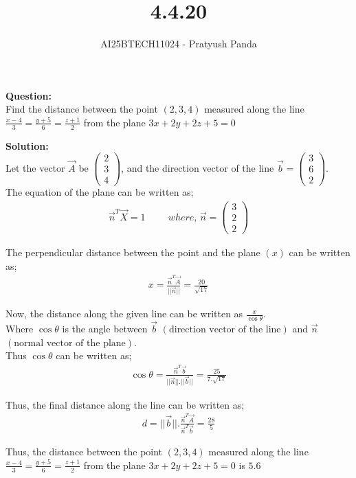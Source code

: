\documentclass{beamer}
\title{4.4.20}
\author{AI25BTECH11024 - Pratyush Panda}
\providecommand{\brak}[1]{\ensuremath{\left(#1\right)}}
\theoremstyle{remark}
\newcommand{\myvec}[1]{\ensuremath{\begin{pmatrix}#1\end{pmatrix}}}
\numberwithin{equation}{section}
\begin{document}
\maketitle

\begin{frame}
\textbf{Question: } \\
Find the distance between the point $\brak{2,3,4}$ measured along the line $\frac{x-4}{3}=\frac{y+5}{6}=\frac{z+1}{2}$ from the plane $3x+2y+2z+5=0$
\end{frame}

\begin{frame}
\textbf{Solution: } \\
Let the vector $\Vec{A}$ be $\myvec{2 \\ 3 \\ 4}$, and the direction vector of the line $\Vec{b}=\myvec{3 \\ 6 \\ 2}$. \\
The equation of the plane can be written as;
\begin{align}
\Vec{n}^T\Vec{X}=1 \hspace{1cm} where, \, \Vec{n}=\myvec{3 \\ 2 \\ 2}
\end{align}

The perpendicular distance between the point and the plane $\brak{x}$ can be written as;
\begin{align}
x=\frac{\Vec{n}^T\Vec{A}}{||\Vec{n}||}=\frac{20}{\sqrt{17}}
\end{align}
\end{frame}

\begin{frame}
Now, the distance along the given line can be written as $\frac{x}{\cos\theta}$. \\
Where $\cos\theta$ is the angle between $\Vec{b}$ \brak{\text{direction vector of the line}} and $\Vec{n}$ \brak{\text{normal vector of the plane}}. \\

Thus $\cos\theta$ can be written as;
\begin{align}
\cos\theta = \frac{\Vec{n}^T\Vec{b}}{||\Vec{n}||.||\Vec{b}||}=\frac{25}{7.\sqrt{17}}
\end{align}

Thus, the final distance along the line can be written as;
\begin{align}
d=||\Vec{b}||.\frac{\Vec{n}^T\Vec{A}}{\Vec{n}^T\Vec{b}}=\frac{28}{5}
\end{align}

Thus, the distance between the point $\brak{2,3,4}$ measured along the line $\frac{x-4}{3}=\frac{y+5}{6}=\frac{z+1}{2}$ from the plane $3x+2y+2z+5=0$ is $5.6$
\end{frame}
\end{document}
